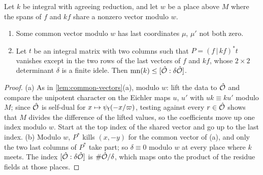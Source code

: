 \begin{lemma}\label{lem:meeting-places}
Let $k$ be integral with agreeing reduction, and let $w$ be a place above $M$ where the spans of $f$ and $kf$ share a nonzero vector modulo $w$.
\begin{enumerate}[label=\textup{(\alph*)}]
\item Some common vector modulo $w$ has last coordinates $\mu$, $\mu'$ not both zero.
\item Let $t$ be an integral matrix with two columns such that $P=(f\,|\,kf)^*t$ vanishes except in the two rows of the last vectors of $f$ and $kf$, whose $2\times2$ determinant $\delta$ is a finite idele. Then $\mathrm{mn}(k)\le[\hat{\mathcal{O}}:\delta\hat{\mathcal{O}}]$.
\end{enumerate}
\end{lemma}

\begin{proof}
(a) As in \cref{lem:common-vectors}(a), modulo $w$: lift the data to $\hat{\mathcal{O}}$ and compare the unipotent character on the Eichler maps $u$, $u'$ with $uk\equiv ku'$ modulo $M$; since $\hat{\mathcal{O}}$ is self-dual for $x\mapsto\psi_{\rm f}(-x/\varpi)$, testing against every $r\in\hat{\mathcal{O}}$ shows that
$M$ divides the difference of the lifted values, so the coefficients move up one index modulo $w$. Start at the top index of the shared vector and go up to the last index. (b) Modulo $w$, $P^*$ kills $(x,-y)$ for the common vector of (a), and only the two last columns of $P^*$ take part;
so $\delta\equiv0$ modulo $w$ at every place where $k$ meets. The index $[\hat{\mathcal{O}}:\delta\hat{\mathcal{O}}]$ is $\#\hat{\mathcal{O}}/\delta$, which maps onto the product of the residue fields at those places.
\end{proof}

